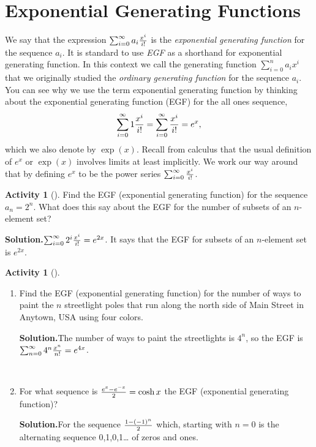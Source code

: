 \documentclass[10pt,]{book}
\theoremstyle{plain}
\theoremstyle{definition}
\newtheorem{activity}[project]{Activity}
\numberwithin{equation}{chapter}
\begin{document}
\section[{Exponential Generating Functions}]{Exponential Generating Functions}\label{section-7}
We say that the expression \(\sum_{i=0}^\infty a_i{x^i\over i!}\) is the \emph{exponential generating function} for the sequence \(a_i\). It is standard to use \emph{EGF} as a shorthand for exponential generating function. In this context we call the generating function \(\sum_{i=0}^n a_ix^i\) that we originally studied the \emph{ordinary generating function} for the sequence \(a_i\). You can see why we use the term exponential generating function by thinking about the exponential generating function (EGF) for the all ones sequence,%
\begin{equation*}
\sum_{i=0}^\infty 1{x^i\over i!} = \sum_{i=0}^\infty {x^i\over i!}
=e^x,
\end{equation*}
which we also denote by \(\exp (x)\). Recall from calculus that the usual definition of \(e^x\) or \(\exp(x)\) involves limits at least implicitly. We work our way around that by defining \(e^x\) to be the power series \(\sum_{i=0}^\infty
{x^i\over i!}\).%
\begin{activity}[]\label{activity-77}
Find the EGF (exponential generating function) for the sequence \(a_n=2^n\). What does this say about the EGF for the number of subsets of an \(n\)-element set?%
\par\medskip\noindent%
\textbf{Solution.}\quad \(\sum_{i=0}^\infty {2^i}{x^i\over i!}=e^{2x}\). It says that the EGF for subsets of an \(n\)-element set is \(e^{2x}\).%
\end{activity}
\begin{activity}[]\label{paintinglightpoles}
~\par
\begin{enumerate}[label=(\alph*)]
 \item Find the EGF (exponential generating function) for the number of ways to paint the \(n\) streetlight poles that run along the north side of Main Street in Anytown, USA using four colors.%
\par\medskip\noindent%
\textbf{Solution.}\quad The number of ways to paint the streetlights is \(4^n\), so the EGF is \(\sum_{n=0}^\infty 4^n{x^n\over n!}=e^{4x}\).%

~\par
\item For what sequence is \({e^x-e^{-x}\over 2} =\cosh x\) the EGF (exponential generating function)?%
\par\medskip\noindent%
\textbf{Solution.}\quad For the sequence \(1-(-1)^n\over 2\) which, starting with \(n=0\) is the alternating sequence 0,1,0,1\dots{} of zeros and ones.%

\end{enumerate}
\end{activity}
\end{document}
